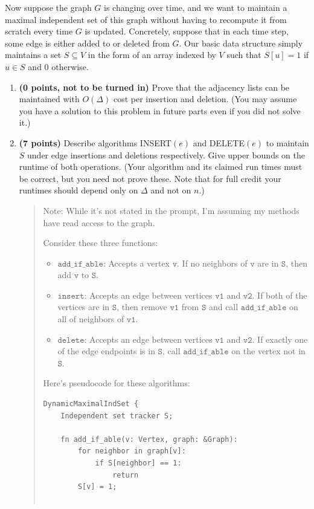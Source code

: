 \documentclass[11pt]{article}
\newcommand{\code}[1]{$\texttt{#1}$}
\begin{document}
\begin{enumerate}
Now suppose the graph $G$ is changing over time, and we want to maintain a maximal independent set of this graph without having to recompute it from scratch every time $G$ is updated. Concretely, suppose that in each time step, some edge is either added to or deleted from $G$. Our basic data structure simply maintains a set $S \subseteq V$ in the form of an array indexed by $V$ such that $S[u]=1$ if $u \in S$ and $0$ otherwise.

\begin{enumerate}[resume]
    \item {\bf (0 points, not to be turned in)} Prove that the adjacency lists can be maintained with $O(\Delta)$ cost per insertion and deletion. (You may assume you have a solution to this problem in future parts even if you did not solve it.)
    \item {\bf (7 points)} Describe algorithms INSERT$(e)$ and DELETE$(e)$ to maintain $S$ under edge insertions and deletions respectively. Give upper bounds on the runtime of both operations. \label{part:2c} (Your algorithm and its claimed run times must be correct, but you need not prove these. Note that for full credit your runtimes should depend only on $\Delta$ and not on $n$.)
    \begin{quote}
      \color{purple}
      Note: While it's not stated in the prompt, I'm assuming my methods have read access to the graph. 

      \medskip 
      Consider these three functions:
      \begin{itemize}
        \item \code{add\_if\_able}: Accepts a vertex \code{v}. If no neighbors of \code{v} are in \code{S}, then add \code{v} to \code{S}.
        \item \code{insert}: Accepts an edge between vertices \code{v1} and \code{v2}. If both of the vertices are in \code{S}, then remove \code{v1} from \code{S} and call \code{add\_if\_able} on all of neighbors of \code{v1}.
        \item \code{delete}: Accepts an edge between vertices \code{v1} and \code{v2}. If exactly one of the edge endpoints is in \code{S}, call \code{add\_if\_able} on the vertex not in \code{S}.
      \end{itemize}
      Here's pseudocode for these algorithms:
      \newpage
\begin{verbatim}
DynamicMaximalIndSet {
    Independent set tracker S;

    fn add_if_able(v: Vertex, graph: &Graph):
        for neighbor in graph[v]:
            if S[neighbor] == 1:
                return
        S[v] = 1;


\end{verbatim}
\end{quote}
\end{enumerate}
\end{enumerate}
\end{document}
